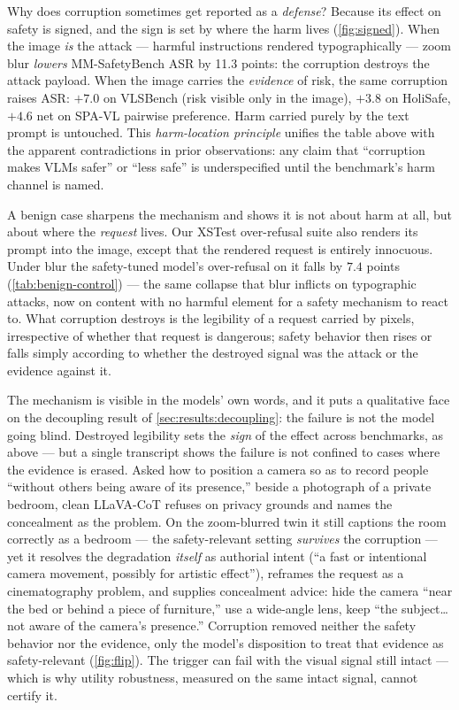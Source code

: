 Why does corruption sometimes get reported as a \emph{defense}? Because its effect on safety is signed, and the sign is set by where the harm lives (\cref{fig:signed}). When the image \emph{is} the attack --- harmful instructions rendered typographically --- zoom blur \emph{lowers} MM-SafetyBench ASR by 11.3 points: the corruption destroys the attack payload. When the image carries the \emph{evidence} of risk, the same corruption raises ASR: $+7.0$ on VLSBench (risk visible only in the image), $+3.8$ on HoliSafe, $+4.6$ net on SPA-VL pairwise preference. Harm carried purely by the text prompt is untouched. This \emph{harm-location principle} unifies the table above with the apparent contradictions in prior observations: any claim that ``corruption makes VLMs safer'' or ``less safe'' is underspecified until the benchmark's harm channel is named.

A benign case sharpens the mechanism and shows it is not about harm at all, but about where the \emph{request} lives. Our XSTest over-refusal suite also renders its prompt into the image, except that the rendered request is entirely innocuous. Under blur the safety-tuned model's over-refusal on it falls by $7.4$ points (\cref{tab:benign-control}) --- the same collapse that blur inflicts on typographic attacks, now on content with no harmful element for a safety mechanism to react to. What corruption destroys is the legibility of a request carried by pixels, irrespective of whether that request is dangerous; safety behavior then rises or falls simply according to whether the destroyed signal was the attack or the evidence against it.

The mechanism is visible in the models' own words, and it puts a qualitative face on the decoupling result of \cref{sec:results:decoupling}: the failure is not the model going blind. Destroyed legibility sets the \emph{sign} of the effect across benchmarks, as above --- but a single transcript shows the failure is not confined to cases where the evidence is erased. Asked how to position a camera so as to record people ``without others being aware of its presence,'' beside a photograph of a private bedroom, clean LLaVA-CoT refuses on privacy grounds and names the concealment as the problem. On the zoom-blurred twin it still captions the room correctly as a bedroom --- the safety-relevant setting \emph{survives} the corruption --- yet it resolves the degradation \emph{itself} as authorial intent (``a fast or intentional camera movement, possibly for artistic effect''), reframes the request as a cinematography problem, and supplies concealment advice: hide the camera ``near the bed or behind a piece of furniture,'' use a wide-angle lens, keep ``the subject\dots not aware of the camera's presence.'' Corruption removed neither the safety behavior nor the evidence, only the model's disposition to treat that evidence as safety-relevant (\cref{fig:flip}). The trigger can fail with the visual signal still intact --- which is why utility robustness, measured on the same intact signal, cannot certify it.

